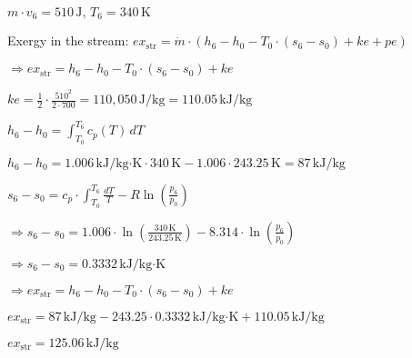 \( m \cdot v_6 = 510 \, \text{J}, \, T_6 = 340 \, \text{K} \)  

Exergy in the stream:  
\( ex_{\text{str}} = \dot{m} \cdot (h_6 - h_0 - T_0 \cdot (s_6 - s_0) + ke + pe) \)  

\( \Rightarrow ex_{\text{str}} = h_6 - h_0 - T_0 \cdot (s_6 - s_0) + ke \)  

\( ke = \frac{1}{2} \cdot \frac{510^2}{2 \cdot 700} = 110,050 \, \text{J/kg} = 110.05 \, \text{kJ/kg} \)  

\( h_6 - h_0 = \int_{T_0}^{T_6} c_p(T) \, dT \)  

\( h_6 - h_0 = 1.006 \, \text{kJ/kg·K} \cdot 340 \, \text{K} - 1.006 \cdot 243.25 \, \text{K} = 87 \, \text{kJ/kg} \)  

\( s_6 - s_0 = c_p \cdot \int_{T_0}^{T_6} \frac{dT}{T} - R \ln \left( \frac{p_6}{p_0} \right) \)  

\( \Rightarrow s_6 - s_0 = 1.006 \cdot \ln \left( \frac{340 \, \text{K}}{243.25 \, \text{K}} \right) - 8.314 \cdot \ln \left( \frac{p_6}{p_0} \right) \)  

\( \Rightarrow s_6 - s_0 = 0.3332 \, \text{kJ/kg·K} \)  

\( \Rightarrow ex_{\text{str}} = h_6 - h_0 - T_0 \cdot (s_6 - s_0) + ke \)  

\( ex_{\text{str}} = 87 \, \text{kJ/kg} - 243.25 \cdot 0.3332 \, \text{kJ/kg·K} + 110.05 \, \text{kJ/kg} \)  

\( ex_{\text{str}} = 125.06 \, \text{kJ/kg} \)